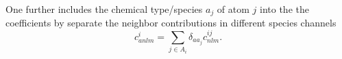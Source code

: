 One further includes the chemical type/species $a_j$ of atom $j$ into the the coefficients by separate the neighbor contributions in different species channels
\begin{equation}
  \label{eq:chemical_decomposition}
  c^{i}_{anlm} = \sum_{j\in A_i} \delta_{aa_j}c^{ij}_{nlm}.
\end{equation}




